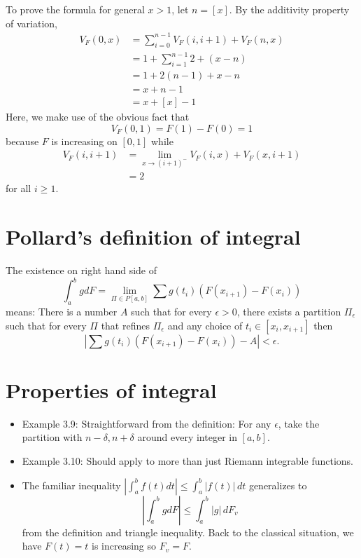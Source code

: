 \documentclass{article}
\newcommand{\Abs}[1]{\left| #1 \right|}
\begin{document}
To prove the formula for general $x > 1$, let $n = [x]$. By the additivity property of variation,
\begin{align*}
V_F(0, x) &= \sum_{i = 0}^{n - 1} V_F(i, i+1) + V_F(n, x)\\
&= 1 + \sum_{i = 1}^{n - 1} 2 + (x - n)\\
&= 1 + 2(n - 1) + x - n\\
&= x + n - 1\\
&= x + [x] - 1
\end{align*}
Here, we make use of the obvious fact that
$$V_F(0, 1) = F(1) - F(0) = 1$$
because $F$ is increasing on $[0, 1]$ while
\begin{align*}
V_F(i, i + 1) &= \lim_{x \rightarrow (i+1)^-} V_F(i, x) + V_F(x, i+1)\\
&= 2
\end{align*}
for all $i \geq 1$.

\section{Pollard's definition of integral}

The existence on right hand side of
$$\int_a^b g dF = \lim_{\Pi \in P[a, b]} \sum g(t_i) (F(x_{i+1}) - F(x_i))$$
means: There is a number $A$ such that for every $\epsilon > 0$, there exists a partition $\Pi_\epsilon$ such that for every $\Pi$ that refines $\Pi_\epsilon$ and any choice of $t_i \in [x_i, x_{i+1}]$ then
$$\Abs{ \sum g(t_i) (F(x_{i+1}) - F(x_i)) - A } < \epsilon.$$

\section{Properties of integral}

\begin{itemize}
\item Example 3.9: Straightforward from the definition: For any $\epsilon$, take the partition with $n - \delta, n + \delta$ around every integer in $[a, b]$.

\item Example 3.10: Should apply to more than just Riemann integrable functions.

\item The familiar inequality $\Abs{ \int_a^b f(t) dt } \leq \int_a^b \Abs{ f(t) } \, dt$ generalizes to
$$\Abs{ \int_a^b g dF } \leq \int_a^b \Abs{ g } \, dF_v$$
from the definition and triangle inequality. Back to the classical situation, we have $F(t) = t$ is increasing so $F_v = F$.
\end{itemize}
\end{document}
